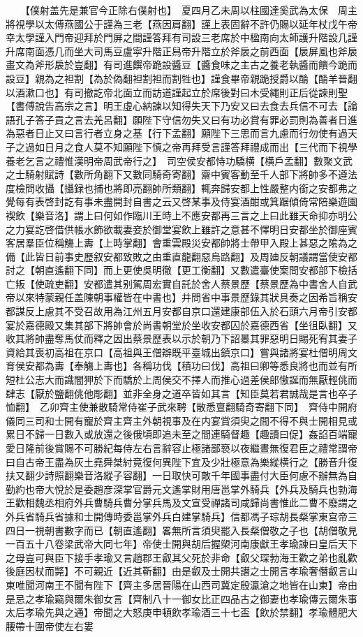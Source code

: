 　　【僕射盖先是兼官今正除右僕射也】　夏四月乙未周以柱國達奚武為太保　周主將視學以太傅燕國公于謹為三老【燕因肩翻】謹上表固辭不許仍賜以延年杖戊午帝幸太學謹入門帝迎拜於門屏之間謹答拜有司設三老席於中楹南向太師護升階設几謹升席南面憑几而坐大司馬豆盧寜升階正舄帝升階立於斧扆之前西面【扆屏風也斧扆畫文為斧形扆於豈翻】有司進饌帝跪設醬豆【醬食味之主古之養老執醬而饋今跪而設豆】親為之袒割【為於偽翻袒割袒而割牲也】謹食畢帝親跪授爵以酳【酳羊晉翻以酒漱口也】有司撤訖帝北面立而訪道謹起立於席後對曰木受繩則正后從諫則聖【書傅說告高宗之言】明王虛心納諫以知得失天下乃安又曰去食去兵信不可去【論語孔子答子貢之言去羌呂翻】願陛下守信勿失又曰有功必賞有罪必罰則為善者日進為惡者日止又曰言行者立身之基【行下孟翻】願陛下三思而言九慮而行勿使有過天子之過如日月之食人莫不知願陛下慎之帝再拜受言謹答拜禮成而出【三代而下視學養老乞言之禮惟漢明帝周武帝行之】　司空侯安都恃功驕横【横戶孟翻】數聚文武之士騎射賦詩【數所角翻下又數同騎奇寄翻】齋中賓客動至千人部下將帥多不遵法度檢問收攝【攝録也捕也將即亮翻帥所類翻】輒奔歸安都上性嚴整内銜之安都弗之覺每有表啓封訖有事未盡開封自書之云又啓某事及侍宴酒酣或箕踞傾倚常陪樂遊園褉飲【樂音洛】謂上曰何如作臨川王時上不應安都再三言之上曰此雖天命抑亦明公之力宴訖啓借供帳水飾欲載妻妾於御堂宴飲上雖許之意甚不懌明日安都坐於御座賓客居羣臣位稱觴上夀【上時掌翻】會重雲殿災安都帥將士帶甲入殿上甚惡之隂為之備【此皆日前事史歷叙安都致敗之由重直龍翻惡烏路翻】及周廸反朝議謂當使安都討之【朝直遙翻下同】而上更使吳明徹【更工衡翻】又數遣臺使案問安都部下檢括亡叛【使疏吏翻】安都遣其别駕周宏實自託於舍人蔡景歷【蔡景歷為中書舍人自武帝以來特蒙親任盖陳朝事權皆在中書也】并問省中事景歷錄其狀具奏之因希旨稱安都謀反上慮其不受召故用為江州五月安都自京口還建康部伍入於石頭六月帝引安都宴於嘉德殿又集其部下將帥會於尚書朝堂於坐收安都囚於嘉德西省【坐徂臥翻】又收其將帥盡奪馬仗而釋之因出蔡景歷表以示於朝乃下詔㬥其罪惡明日賜死宥其妻子資給其喪初高祖在京口【高祖與王僧辯既平臺城出鎮京口】嘗與諸將宴杜僧明周文育侯安都為夀【奉觴上夀也】各稱功伐【積功曰伐】高祖曰卿等悉良將也而並有所短杜公志大而識闇狎於下而驕於上周侯交不擇人而推心過差侯郎慠誕而無厭輕佻而肆志【厭於鹽翻佻他彫翻】並非全身之道卒皆如其言【知臣莫若君誠哉是言也卒子恤翻】　乙卯齊主使兼散騎常侍崔子武來聘【散悉亶翻騎奇寄翻下同】　齊侍中開府儀同三司和士開有寵於齊主齊主外朝視事及在内宴賞須臾之間不得不與士開相見或累日不歸一日數入或放還之後俄頃即追未至之間連騎督趣【趣讀曰促】姦諂百端寵愛日隆前後賞賜不可勝紀每侍左右言辭容止極諸鄙䙝以夜繼晝無復君臣之禮常謂帝曰自古帝王盡為灰土堯舜桀紂竟復何異陛下宜及少壯極意為樂縱横行之【勝音升復扶又翻少詩照翻樂音洛縱子容翻】一日取快可敵千年國事盡付大臣何慮不辦無為自勤約也帝大悅於是委趙彦深掌官爵元文遙掌財用唐邕掌外騎兵【外兵及騎兵也勃海王歡相魏丞相府外兵曹騎兵曹分掌兵馬及文宣受禪諸司咸歸尚書惟此二曹不廢謂之外兵省騎兵省據和士開傳時委邕掌外兵白建掌騎兵】信都馮子琮胡長粲掌東宫帝三四日一視朝書數字而已【朝直遙翻】畧無所言須臾罷入長粲僧敬之子也【胡僧敬見一百五十八卷梁武帝大同七年】帝使士開與胡后握槊河南康獻王孝瑜諫曰皇后天下之母豈可與臣下接手孝瑜又言趙郡王叡其父死於非命【叡父琛勃海王歡之弟也亂歡後庭因杖而斃】不可親近【近其靳翻】由是叡及士開共譖之士開言孝瑜奢僭叡言山東唯聞河南王不聞有陛下【齊主多居晉陽在山西司冀定殷瀛滄之地皆在山東】帝由是忌之孝瑜竊與爾朱御女言【齊制八十一御女比正四品古之御妻也孝瑜傳云爾朱事太后孝瑜先與之通】帝聞之大怒庚申頓飲孝瑜酒三十七盃【飲於禁翻】孝瑜體肥大腰帶十圍帝使左右婁